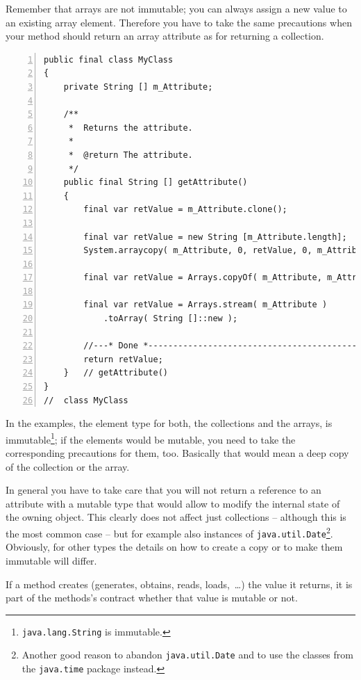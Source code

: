\documentclass[11pt,a4paper, titlepage, parskip=half, headsepline, footsepline, cleardoublepage=current, headheight=1cm]{scrbook}
\begin{document}
Remember that arrays are not immutable; you can always assign a new value to an existing array element. Therefore you have to take the same precautions when your method should return an array attribute as for returning a collection.
\begin{lstlisting}[numbers=left]
public final class MyClass
{
    private String [] m_Attribute;

    /**
     *  Returns the attribute.
     * 
     *  @return The attribute.
     */ 
    public final String [] getAttribute()
    {
        final var retValue = m_Attribute.clone();

        final var retValue = new String [m_Attribute.length];
        System.arraycopy( m_Attribute, 0, retValue, 0, m_Attribute.length );

        final var retValue = Arrays.copyOf( m_Attribute, m_Attribute.length );

        final var retValue = Arrays.stream( m_Attribute )
            .toArray( String []::new );

        //---* Done *------------------------------------------------
        return retValue;
    }   // getAttribute()
}
//  class MyClass    
\end{lstlisting}

In the examples, the element type for both, the collections and the arrays, is immutable\footnote{\lstinline|java.lang.String| is immutable.}; if the elements would be mutable, you need to take the corresponding precautions for them, too. Basically that would mean a deep copy of the collection or the array.

In general you have to take care that you will not return a reference to an attribute with a mutable type that would allow to modify the internal state of the owning object. This clearly does not affect just collections – although this is the most common case – but for example also instances of \lstinline|java.util.Date|\autocite{ORACLE_DOC_DATE_CLASS}\footnote{Another good reason to abandon \lstinline|java.util.Date| and to use the classes from the \lstinline|java.time|\autocite{ORACLE_DOC_TIME_PACKAGE} package instead.}. Obviously, for other types the details on how to create a copy or to make them immutable will differ.

If a method creates (generates, obtains, reads, loads,~…) the value it returns, it is part of the methods's contract whether that value is mutable or not.
\end{document}
